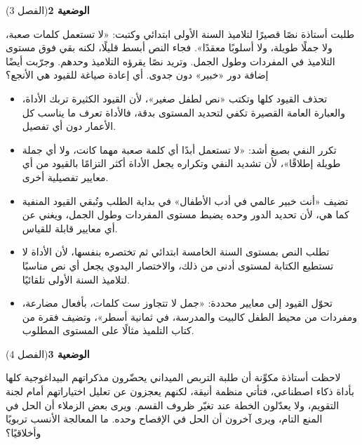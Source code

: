 \documentclass[11pt,a4paper]{article}
\begin{document}
\par\vspace{6pt}
\noindent
{\large\khatt\textbf{الوضعية 2}}\hfill{\small(الفصل 3)}\par\nopagebreak\vspace{3pt}
\setlength{\fboxsep}{7pt}\colorbox{gray!10}{\parbox{\dimexpr\linewidth-14pt}{طلبت أستاذة نصًا قصيرًا لتلاميذ السنة الأولى ابتدائي وكتبت: «لا تستعمل كلمات صعبة، ولا جملًا طويلة، ولا أسلوبًا معقدًا». فجاء النص أبسط قليلًا، لكنه بقي فوق مستوى التلاميذ في المفردات وطول الجمل. وتريد نصًا يقرؤه التلاميذ وحدهم. وجرّبت أيضًا إضافة دور «خبير» دون جدوى. أي إعادة صياغة للقيود هي الأنجع؟}}\par\nopagebreak
\begin{itemize}[leftmargin=1.0cm, labelsep=6pt, itemsep=3pt, topsep=4pt, parsep=0pt]
  \item[\textbf{أ)}] تحذف القيود كلها وتكتب «نص لطفل صغير»، لأن القيود الكثيرة تربك الأداة، والعبارة العامة القصيرة تكفي لتحديد المستوى بدقة، فالأداة تعرف ما يناسب كل الأعمار دون أي تفصيل.
  \item[\textbf{ب)}] تكرر النفي بصيغ أشد: «لا تستعمل أبدًا أي كلمة صعبة مهما كانت، ولا أي جملة طويلة إطلاقًا»، لأن تشديد النفي وتكراره يجعل الأداة أكثر التزامًا بالقيود من أي معايير تفصيلية أخرى.
  \item[\textbf{ج)}] تضيف «أنت خبير عالمي في أدب الأطفال» في بداية الطلب وتُبقي القيود المنفية كما هي، لأن تحديد الدور وحده يضبط مستوى المفردات وطول الجمل، ويغني عن أي معايير قابلة للقياس.
  \item[\textbf{د)}] تطلب النص بمستوى السنة الخامسة ابتدائي ثم تختصره بنفسها، لأن الأداة لا تستطيع الكتابة لمستوى أدنى من ذلك، والاختصار اليدوي يجعل أي نص مناسبًا لتلاميذ السنة الأولى تلقائيًا.
  \item[\textbf{هـ)}] تحوّل القيود إلى معايير محددة: «جمل لا تتجاوز ست كلمات، بأفعال مضارعة، ومفردات من محيط الطفل كالبيت والمدرسة، في ثمانية أسطر»، وتضيف فقرة من كتاب التلميذ مثالًا على المستوى المطلوب.
\end{itemize}
\par\vspace{6pt}
\noindent
{\large\khatt\textbf{الوضعية 3}}\hfill{\small(الفصل 4)}\par\nopagebreak\vspace{3pt}
\setlength{\fboxsep}{7pt}\colorbox{gray!10}{\parbox{\dimexpr\linewidth-14pt}{لاحظت أستاذة مكوِّنة أن طلبة التربص الميداني يحضّرون مذكراتهم البيداغوجية كلها بأداة ذكاء اصطناعي، فتأتي منظمة أنيقة، لكنهم يعجزون عن تعليل اختياراتهم أمام لجنة التقويم، ولا يعدّلون الخطة عند تغيّر ظروف القسم. ويرى بعض الزملاء أن الحل في المنع التام، ويرى آخرون أن الحل في الإفصاح وحده. ما المعالجة الأنسب تربويًا وأخلاقيًا؟}}\par\nopagebreak
\end{document}
